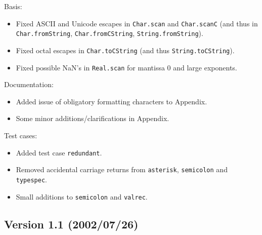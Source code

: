 \documentclass[twoside,titlepage]{article}
\begin{document}
\begin{appendix}
Basis:
\begin{itemize} \setlength{\itemsep}{0em}
\item Fixed ASCII and Unicode escapes in {\tt Char.scan} and {\tt Char.scanC} (and thus in {\tt Char.fromString}, {\tt Char.fromCString}, {\tt String.fromString}).
\item Fixed octal escapes in {\tt Char.toCString} (and thus {\tt String.toCString}).
\item Fixed possible NaN's in {\tt Real.scan} for mantissa 0 and large exponents.
\end{itemize}

Documentation:
\begin{itemize} \setlength{\itemsep}{0em}
\item Added issue of obligatory formatting characters to Appendix.
\item Some minor additions/clarifications in Appendix.
\end{itemize}

Test cases:
\begin{itemize} \setlength{\itemsep}{0em}
\item Added test case {\tt redundant}.
\item Removed accidental carriage returns from {\tt asterisk}, {\tt semicolon} and {\tt typespec}.
\item Small additions to {\tt semicolon} and {\tt valrec}.
\end{itemize}

\subsection*{Version 1.1 (2002/07/26)}


\end{appendix}
\end{document}
